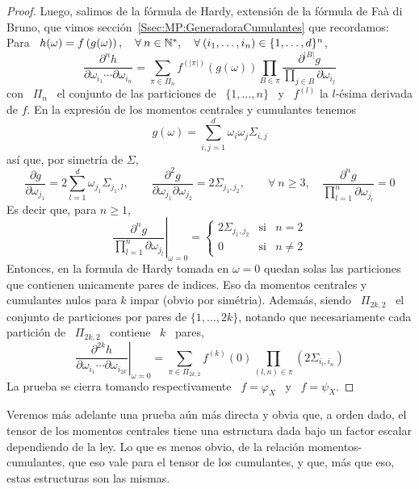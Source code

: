 \begin{proof}
  Luego, salimos de la f\'ormula de  Hardy, extensi\'on de la f\'ormula de Fa\`a
  di   Bruno,   que   vimos   secci\'on~\ref{Ssec:MP:GeneradoraCumulantes}   que
  recordamos: Para \ $h(\omega) =  f\left( g(\omega) \right), \quad \forall \: n
  \in \mathbb{N}^*,  \quad \forall \:  (i_1 , \ldots ,  i_n ) \in  \{ 1 , \ldots  , d
  \}^n$,
  \[
  \frac{\partial^n  h}{\partial  \omega_{i_1}  \cdots \partial  \omega_{i_n}}  =
  \sum_{\pi  \in \Pi_n}  f^{(|\pi|)}\left( g(\omega)  \right) \prod_{B  \in \pi}
  \frac{\partial^{|B|} g}{\displaystyle \prod_{j \in B} \partial \omega_{i_j}}
  \]
  con \ $\Pi_n$ \ el conjunto de las particiones de \ $\{ 1 , \ldots , n \}$ \ y
  \ $f^{(l)}$ la $l$-\'esima derivada de $f$.  En la expresi\'on de los momentos
  centrales y cumulantes tenemos
  \[
  g(\omega) = \sum_{i,j=1}^d \omega_i \omega_j \Sigma_{i,j}
  \]
  as\'i que, por simetr\'ia de $\Sigma$,
  \[
  \frac{\partial  g}{\partial   \omega_{j_1}}  =  2   \sum_{l=1}^d  \omega_{j_1}
  \Sigma_{j_1,l},  \qquad  \frac{\partial^2  g}{\partial  \omega_{j_1}  \partial
    \omega_{j_2}}  =  2 \Sigma_{j_1,j_2},  \qquad  \forall  \:  n \ge  3,  \quad
  \frac{\partial^n g}{\prod_{l=1}^n \partial \omega_{j_l}} = 0
  \]
  Es decir que, para $n \ge 1$,
  \[
  \left.      \frac{\partial^n    g}{\prod_{l=1}^n     \partial    \omega_{j_l}}
  \right|_{\omega = 0} = \left\{\begin{array}{ccl}
  2   \Sigma_{j_1,j_2} & \mbox{si} & n = 2\\[2mm]
  0 & \mbox{si} & n \ne 2
  \end{array}\right.
  \]
  Entonces,  en la formula  de Hardy  tomada en  $\omega =  0$ quedan  solas las
  particiones  que  contienen unicamente  pares  de  indices.   Eso da  momentos
  centrales y cumulantes nulos para $k$ impar (obvio por sim\'etria). Adema\'as,
  siendo \  $\Pi_{2 k , 2}$  \ el conjunto de  particiones por pares de  $\{ 1 ,
  \ldots , 2 k \}$, notando que necesariamente cada partici\'on de \ $\Pi_{2 k ,
    2}$ \ contiene \ $k$ \ pares,
  \[
  \left.   \frac{\partial^{2  k}   h}{\partial   \omega_{i_1}  \cdots   \partial
      \omega_{i_{2  k}}}\right|_{\omega =  0} =  \sum_{\pi  \in \Pi_{2  k ,  2}}
  f^{(k)}(0) \prod_{(l,n) \in \pi} \left( 2 \Sigma_{i_l,i_n} \right)
  \]
  La prueba  se cierra  tomando respectivamente  \ $f =  \varphi_X$ \  y \  $f =
  \psi_X$.
\end{proof}
%
Veremos m\'as adelante una prueba a\'un m\'as directa y obvia que, a orden dado,
el tensor  de los momentos  centrales tiene una  estructura dada bajo  un factor
escalar  dependiendo  de la  ley.   Lo  que es  menos  obvio,  de la  relaci\'on
momentos-cumulantes, que eso vale para el tensor de los cumulantes, y que, m\'as
que eso, estas estructuras son las mismas.

